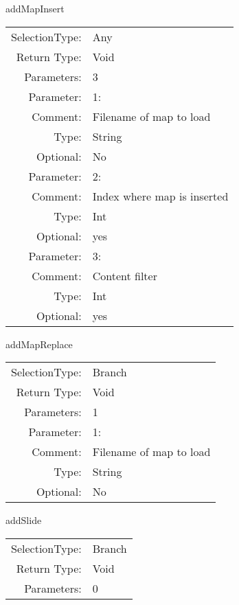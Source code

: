 \item addMapInsert\\
\begin{tabular}{rl}
  SelectionType: & Any\\
    Return Type: & Void\\
     Parameters: & 3\\
   Parameter: &  1:\\
        Comment: & Filename of map to load\\
           Type: & String\\
       Optional: &  No\\
   Parameter: &  2:\\
        Comment: & Index where map is inserted\\
           Type: & Int\\
       Optional: &  yes\\
   Parameter: &  3:\\
        Comment: & Content filter\\
           Type: & Int\\
       Optional: &  yes\\
\end{tabular}

\item addMapReplace\\
\begin{tabular}{rl}
  SelectionType: & Branch\\
    Return Type: & Void\\
     Parameters: & 1\\
   Parameter: &  1:\\
        Comment: & Filename of map to load\\
           Type: & String\\
       Optional: &  No\\
\end{tabular}

\item addSlide\\
\begin{tabular}{rl}
  SelectionType: & Branch\\
    Return Type: & Void\\
     Parameters: & 0\\
\end{tabular}


